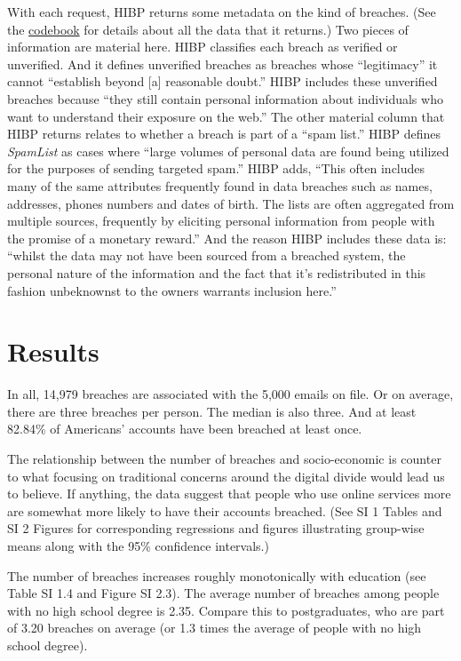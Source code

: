 \documentclass[sigconf]{acmart}
\begin{document}
With each request, HIBP returns some metadata on the kind of breaches. (See the \href{https://github.com/themains/pwned/blob/master/data/Profile_codebook_ygov1058.pdf}{codebook} for details about all the data that it returns.) Two pieces of information are material here. HIBP classifies each breach as verified or unverified. And it defines unverified breaches as breaches whose ``legitimacy'' it cannot ``establish beyond [a] reasonable doubt.'' HIBP includes these unverified breaches because ``they still contain personal information about individuals who want to understand their exposure on the web.'' The other material column that HIBP returns relates to whether a breach is part of a ``spam list.'' HIBP defines {\it SpamList} as cases where ``large volumes of personal data are found being utilized for the purposes of sending targeted spam.'' HIBP adds, ``This often includes many of the same attributes frequently found in data breaches such as names, addresses, phones numbers and dates of birth. The lists are often aggregated from multiple sources, frequently by eliciting personal information from people with the promise of a monetary reward.'' And the reason HIBP includes these data is: ``whilst the data may not have been sourced from a breached system, the personal nature of the information and the fact that it's redistributed in this fashion unbeknownst to the owners warrants inclusion here.''

\section{Results}

In all, 14,979 breaches are associated with the 5,000 emails on file. Or on average, there are three breaches per person. The median is also three. And at least 82.84\% of Americans' accounts have been breached at least once. 

The relationship between the number of breaches and socio-economic is counter to what focusing on traditional concerns around the digital divide would lead us to believe. If anything, the data suggest that people who use online services more are somewhat more likely to have their accounts breached. (See SI 1 Tables and SI 2 Figures for corresponding regressions and figures illustrating group-wise means along with the 95\% confidence intervals.) 

The number of breaches increases roughly monotonically with education (see Table SI 1.4 and Figure SI 2.3). The average number of breaches among people with no high school degree is 2.35. Compare this to postgraduates, who are part of 3.20 breaches on average (or 1.3 times the average of people with no high school degree).
\end{document}
